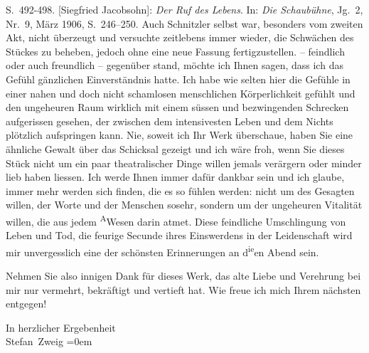{{{                     S. 492-498. [Siegfried Jacobsohn]: \emph{Der Ruf des Lebens}. In: \emph{Die Schaubühne}, Jg. 2, Nr. 9, März 1906,
                     S. 246–250. Auch Schnitzler selbst war, besonders 
               vom zweiten Akt, nicht überzeugt und versuchte zeitlebens immer wieder, die Schwächen des Stückes zu beheben,
               jedoch ohne eine neue Fassung fertigzustellen.}}}\label{K_L03624-2} – feind{\pb}lich oder auch freundlich – gegenüber stand, möchte ich Ihnen sagen, dass ich das
               Gefühl gänzlichen Einverständnis hatte. Ich habe wie selten hier die Gefühle in einer
                  nahen und doch nicht schamlosen menschlichen
               Körperlichkeit gefühlt und den ungeheuren Raum wirklich mit einem süssen und
               bezwingenden Schrecken aufgerissen gesehen, der zwischen dem intensivesten Leben und
               dem Nichts plötzlich aufspringen kann. Nie, soweit ich Ihr Werk überschaue, haben Sie
               eine ähnliche Gewalt über das Schicksal gezeigt und ich wäre froh, wenn Sie \label{T_L03624-1v}\label{T_L03624-1}
               dieses Stück nicht um ein paar
               theatralischer Dinge willen jemals verärgern oder minder lieb haben liessen. Ich
               werde Ihnen immer dafür dankbar sein und ich glaube, immer mehr werden sich finden,
               die es so fühlen werden: nicht um des Gesagten willen, der Worte und der Menschen
               sosehr, sondern um der ungeheuren Vitalität willen, die aus jedem \substVorne{}\textsuperscript{A}\substDazwischen{}W\substHinten{}esen darin atmet.
               Diese feindliche Um{\pb}schlingung von Leben
               und Tod, die feurige Secunde ihres Einswerdens in der Leidenschaft wird mir
               unvergesslich eine der schönsten Erinnerungen an d\substVorne{}\textsuperscript{ie}\substDazwischen{}en\substHinten{} Abend sein.\pend
           
\pstart
           Nehmen Sie also innigen Dank für dieses Werk, das alte Liebe und Verehrung bei mir nur vermehrt,
               bekräftigt und vertieft hat. Wie freue ich mich Ihrem nächsten entgegen!\pend
           
\pstart
           In herzlicher Ergebenheit{\\[\baselineskip]}\spacefill\mbox{Stefan Zweig}\pend
           \leftskip=0em{}\endnumbering{}  
      